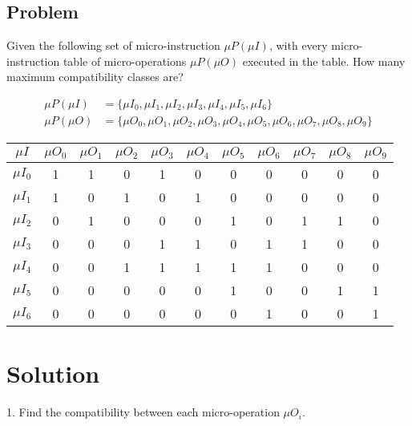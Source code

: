 \subsection*{Problem}
Given the following set of micro-instruction $\mu P(\mu I)$, with every micro-instruction table of micro-operations $\mu P(\mu O)$ executed in the table.
How many maximum compatibility classes are?

\begin{align*}
    \mu P(\mu I) & = \{ \mu I_{0}, \mu I_{1}, \mu I_{2}, \mu I_{3}, \mu I_{4}, \mu I_{5}, \mu I_{6}\} \\
    \mu P(\mu O) & = \{ \mu O_{0}, \mu O_{1}, \mu O_{2}, \mu O_{3}, \mu O_{4}, \mu O_{5}, \mu O_{6}, \mu O_{7}, \mu O_{8}, \mu O_{9}\}
\end{align*}

\begin{table}[H]
    \centering
    \begin{tabular}{|c|c|c|c|c|c|c|c|c|c|c|}
        \hline
        $\mu I$ & $\mu O_{0}$ & $\mu O_{1}$ & $\mu O_{2}$ & $\mu O_{3}$ & $\mu O_{4}$ & $\mu O_{5}$ & $\mu O_{6}$ & $\mu O_{7}$ & $\mu O_{8}$ & $\mu O_{9}$ \\
        \hline
        \hline
        $\mu I_{0}$ & 1 & 1 & 0 & 1 & 0 & 0 & 0 & 0 & 0 & 0 \\ \hline
        $\mu I_{1}$ & 1 & 0 & 1 & 0 & 1 & 0 & 0 & 0 & 0 & 0 \\ \hline
        $\mu I_{2}$ & 0 & 1 & 0 & 0 & 0 & 1 & 0 & 1 & 1 & 0 \\ \hline
        $\mu I_{3}$ & 0 & 0 & 0 & 1 & 1 & 0 & 1 & 1 & 0 & 0 \\ \hline
        $\mu I_{4}$ & 0 & 0 & 1 & 1 & 1 & 1 & 1 & 0 & 0 & 0 \\ \hline
        $\mu I_{5}$ & 0 & 0 & 0 & 0 & 0 & 1 & 0 & 0 & 1 & 1 \\ \hline
        $\mu I_{6}$ & 0 & 0 & 0 & 0 & 0 & 0 & 1 & 0 & 0 & 1 \\ \hline
    \end{tabular}
\end{table}

\section*{Solution}

1. Find the compatibility between each micro-operation $\mu O_{i}$.


